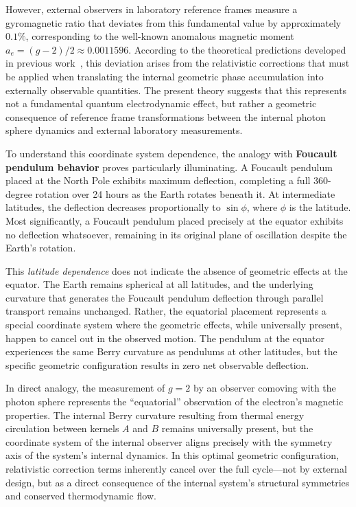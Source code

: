 \documentclass[%
 reprint,
 amsmath,amssymb,
 aps,
]{revtex4-1}
\numberwithin{equation}{section}%
\begin{document}
However, external observers in laboratory reference frames measure a gyromagnetic ratio that deviates from this fundamental value by approximately $0.1\%$, corresponding to the well-known anomalous magnetic moment $a_e = (g-2)/2 \approx 0.0011596$. According to the theoretical predictions developed in previous work~\cite{hanamura2309.0047}, this deviation arises from the relativistic corrections that must be applied when translating the internal geometric phase accumulation into externally observable quantities. The present theory suggests that this represents not a fundamental quantum electrodynamic effect, but rather a geometric consequence of reference frame transformations between the internal photon sphere dynamics and external laboratory measurements.

To understand this coordinate system dependence, the analogy with \textbf{Foucault pendulum behavior} proves particularly illuminating. A Foucault pendulum placed at the North Pole exhibits maximum deflection, completing a full 360-degree rotation over 24 hours as the Earth rotates beneath it. At intermediate latitudes, the deflection decreases proportionally to $\sin\phi$, where $\phi$ is the latitude. Most significantly, a Foucault pendulum placed precisely at the equator exhibits no deflection whatsoever, remaining in its original plane of oscillation despite the Earth's rotation.

This \textit{latitude dependence} does not indicate the absence of geometric effects at the equator. The Earth remains spherical at all latitudes, and the underlying curvature that generates the Foucault pendulum deflection through parallel transport remains unchanged. Rather, the equatorial placement represents a special coordinate system where the geometric effects, while universally present, happen to cancel out in the observed motion. The pendulum at the equator experiences the same Berry curvature as pendulums at other latitudes, but the specific geometric configuration results in zero net observable deflection.

In direct analogy, the measurement of $g = 2$ by an observer comoving with the photon sphere represents the ``equatorial'' observation of the electron's magnetic properties. The internal Berry curvature resulting from thermal energy circulation between kernels $A$ and $B$ remains universally present, but the coordinate system of the internal observer aligns precisely with the symmetry axis of the system’s internal dynamics. In this optimal geometric configuration, relativistic correction terms inherently cancel over the full cycle---not by external design, but as a direct consequence of the internal system's structural symmetries and conserved thermodynamic flow.
\end{document}
